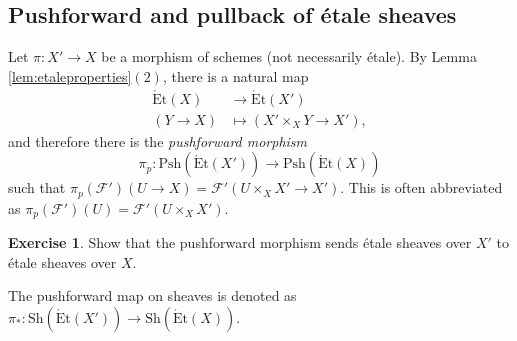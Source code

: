 \documentclass{article}
\newcommand{\Et}{\acute{\mathrm{E}}\mathrm{t}}
\newcommand{\Psh}{\mathrm{Psh}}
\newcommand{\Sh}{\mathrm{Sh}}
\theoremstyle{plain}
\theoremstyle{definition}
\newtheorem*{exercise}{Exercise}
\begin{document}
    \subsection{Pushforward and pullback of \'{e}tale sheaves}\label{sec:pushpull}
    Let $\pi:X'\to X$ be a morphism of schemes (not necessarily \'{e}tale). By Lemma \ref{lem:etaleproperties}$(2)$, there is a natural map 
    \begin{align*}
        \Et(X)&\longrightarrow\Et(X')\\
        (Y\to X)&\longmapsto(X'\times_X Y\to X'),
    \end{align*}
    and therefore there is the \textit{pushforward morphism}
    $$\pi_p:\Psh(\Et(X'))\longrightarrow\Psh(\Et(X))$$
    such that $\pi_p(\mathcal{F}')(U\to X)=\mathcal{F}'(U\times_X X'\to X')$. This is often abbreviated as $\pi_p(\mathcal{F}')(U)=\mathcal{F}'(U\times_X X')$.

    \begin{exercise}
        Show that the pushforward morphism sends \'{e}tale sheaves over $X'$ to \'{e}tale sheaves over $X$. 
    \end{exercise}
    The pushforward map on sheaves is denoted as $\pi_*:\Sh(\Et(X'))\rightarrow\Sh(\Et(X))$.
\end{document}
